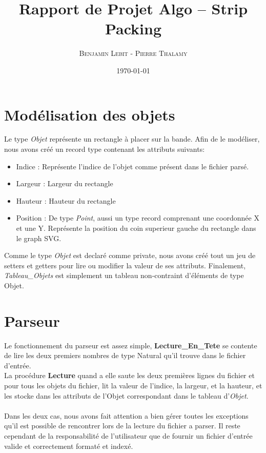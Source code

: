\documentclass{article}
\title{Rapport de Projet Algo -- Strip Packing}
\author{\textsc{Benjamin Lebit} - \textsc{Pierre Thalamy}}
\date{\today}
\begin{document}
\maketitle

\section {Modélisation des objets}
Le type \textit{Objet} représente un rectangle à placer sur la bande. 
Afin de le modéliser, nous avons créé un record type contenant 
les attributs suivants:
\begin{itemize}
  \item Indice : Représente l'indice de l'objet comme présent dans le fichier 
    parsé.
  \item Largeur : Largeur du rectangle
  \item Hauteur : Hauteur du rectangle
  \item Position : De type \textit{Point}, aussi un type record comprenant une 
    coordonnée X et une Y. 
    Représente la position du coin superieur gauche du rectangle dans le graph SVG.
\end{itemize}

Comme le type \textit{Objet} est declaré comme private, nous avons créé tout un jeu de setters et getters pour lire ou modifier la valeur de ses attributs.
Finalement, \textit{Tableau\_Objets} est simplement un tableau non-contraint d'éléments de type Objet.

\section {Parseur}
Le fonctionnement du parseur est assez simple, \textbf{Lecture\_En\_Tete} se contente de lire les deux premiers nombres de type Natural qu'il trouve dans le fichier d'entrée. \\
La procédure \textbf{Lecture} quand a elle saute les deux premières lignes du fichier et pour tous les objets du fichier, lit la valeur de l'indice, la largeur, et la hauteur, et les stocke dans les attributs de l'Objet correspondant dans le tableau 
d'\textit{Objet}.
\paragraph{} Dans les deux cas, nous avons fait attention a bien gérer toutes les exceptions qu'il est possible de rencontrer lors de la lecture du fichier a parser. Il reste cependant de la responsabilité de l'utilisateur que de fournir un fichier d'entrée valide et correctement formaté et indexé.
\newpage
\end{document}
